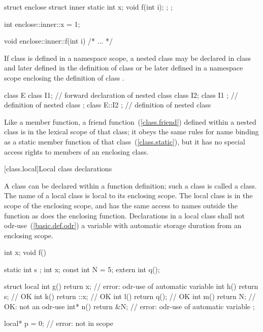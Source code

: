\begin{codeblock}
struct enclose {
  struct inner {
    static int x;
    void f(int i);
  };
};

int enclose::inner::x = 1;

void enclose::inner::f(int i) { /* ... */ }
\end{codeblock}
\exitexample

\pnum
If class  is defined in a namespace scope, a nested class
 may be declared in class  and later defined in the
definition of class  or be later defined in a namespace scope
enclosing the definition of class .
%
\enterexample

\begin{codeblock}
class E {
  class I1;                     // forward declaration of nested class
  class I2;
  class I1 { };                 // definition of nested class
};
class E::I2 { };                // definition of nested class
\end{codeblock}
\exitexample

\pnum
{}%
Like a member function, a friend function~(\ref{class.friend}) defined
within a nested class is in the lexical scope of that class; it obeys
the same rules for name binding as a static member function of that
class~(\ref{class.static}), but it has no special access rights to
members of an enclosing class.

[class.local]{Local class declarations}
%
%

\pnum
A class can be declared within a function definition; such a class is
called a  class. The name of a local class is local to
its enclosing scope.
%
The local class is in the scope of the enclosing scope, and has the same
access to names outside the function as does the enclosing function.
Declarations in a local class
shall not odr-use~(\ref{basic.def.odr}) a variable with automatic storage
duration from an
enclosing scope.
\enterexample
{}%
\begin{codeblock}
int x;
void f() {
  static int s ;
  int x;
  const int N = 5;
  extern int q();

  struct local {
    int g() { return x; }       // error: odr-use of automatic variable 
    int h() { return s; }       // OK
    int k() { return ::x; }     // OK
    int l() { return q(); }     // OK
    int m() { return N; }       // OK: not an odr-use
    int* n() { return &N; }     // error: odr-use of automatic variable 
  };
}

local* p = 0;                   // error:  not in scope
\end{codeblock}
\exitexample


